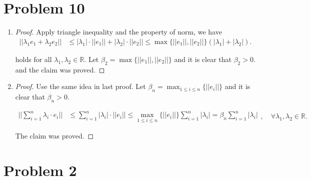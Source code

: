 \documentclass[12pt]{article}
\begin{document}
\section*{Problem 10}
\begin{enumerate}
\item
\begin{proof}

Apply triangle inequality and the property of norm, we have
$$
\begin{aligned}
||\lambda_1e_1 + \lambda_2e_2|| & \leqslant |\lambda_1|\cdot||e_1|| + |\lambda_2|\cdot||e_2|| \leqslant \max \{ ||e_1||, ||e_2|| \}(|\lambda_1| + |\lambda_2|).
\end{aligned}
$$

holds for all $\lambda_1, \lambda_2 \in \mathbb{R}$. Let $\beta_2 = \max \{ ||e_1||, ||e_2|| \}$ and it is clear that $\beta_2 > 0$. and the claim was proved.

\end{proof}

\item

\begin{proof}

Use the same idea in last proof. Let $\beta_n = \max_{1\leqslant i \leqslant n} \{ ||e_i|| \}$ and it is clear that $\beta_n > 0$. 

$$
\begin{aligned}
||\sum_{i=1}^n \lambda_i\cdot e_i|| & \leqslant \sum_{i=1}^n|\lambda_i|\cdot||e_i|| \leqslant \max_{1\leqslant i \leqslant n} \{ ||e_i|| \} \sum_{i=1}^n|\lambda_i| = \beta_n \sum_{i=1}^n|\lambda_i|
\end{aligned}, \quad \forall \lambda_1, \lambda_2 \in \mathbb{R}.
$$

The claim was proved.


\end{proof}


\end{enumerate}




\section*{Problem 2}
\end{document}

